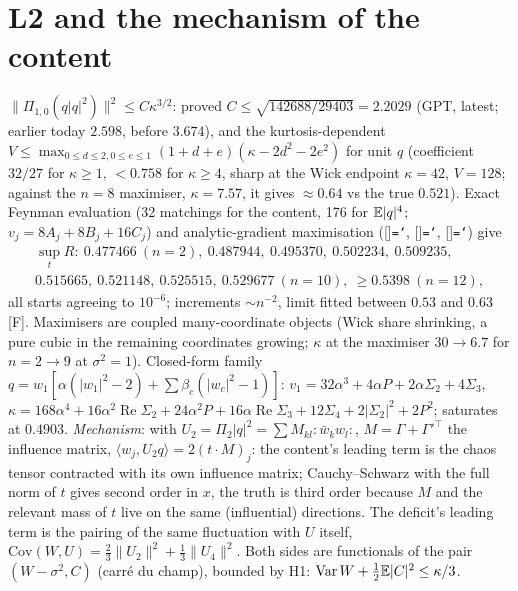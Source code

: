 \documentclass[11pt,a4paper]{article}
\renewcommand{\Re}{\operatorname{Re}}\newcommand{\Var}{\operatorname{Var}}\newcommand{\ph}{\operatorname{phase}}\newcommand{\st}[1]{\textsf{[#1]}}\newcommand{\brkus}{\textunderscore\allowbreak}\usepackage{xstring,adjustbox}\DeclareRobustCommand{\code}[1]{\begingroup\noexpandarg\StrSubstitute{#1}{/}{/\allowbreak}[\brktmp]\texttt{\let\_\brkus\hyphenchar\font=`\-\brktmp}\endgroup}\setlength{\emergencystretch}{3em}
\begin{document}
\section{L2 and the mechanism of the content}\label{sec:L2}
$\|\Pi_{1,0}(q|q|^2)\|^2\le C\kappa^{3/2}$: proved $C\le\sqrt{142688/29403}=2.2029$ (GPT, latest; earlier today $2.598$, before $3.674$), and the kurtosis-dependent $V\le\max_{0\le d\le2,0\le e\le1}(1+d+e)(\kappa-2d^2-2e^2)$ for unit $q$ (coefficient $32/27$ for $\kappa\ge1$, $<0.758$ for $\kappa\ge4$, sharp at the Wick endpoint $\kappa=42$, $V=128$; against the $n=8$ maximiser, $\kappa=7.57$, it gives $\approx0.64$ vs the true $0.521$). Exact Feynman evaluation (32 matchings for the content, 176 for $\mathbb{E}|q|^4$;
$v_j=8A_j+8B_j+16C_j$) and analytic-gradient maximisation (\code{feyn.py}, \code{feyn\_grad.py}, \code{optg.py}) give
\[\begin{gathered}
\sup_tR:\ 0.477466\ (n=2),\ 0.487944,\ 0.495370,\ 0.502234,\ 0.509235,\\
0.515665,\ 0.521148,\ 0.525515,\ 0.529677\ (n=10),\ \ge0.5398\ (n=12),\end{gathered}
\]
all starts agreeing to $10^{-6}$; increments $\sim n^{-2}$, limit fitted between $0.53$ and $0.63$ \st{F}. Maximisers are coupled many-coordinate objects (Wick share shrinking, a pure
cubic in the remaining coordinates growing; $\kappa$ at the maximiser $30\to6.7$ for $n=2\to9$ at $\sigma^2=1$). Closed-form family $q=w_1[\alpha(|w_1|^2-2)+\sum\beta_c(|w_c|^2-1)]$:
$v_1=32\alpha^3+4\alpha P+2\alpha\Sigma_2+4\Sigma_3$, $\kappa=168\alpha^4+16\alpha^2\Re\Sigma_2+24\alpha^2P+16\alpha\Re\Sigma_3+12\Sigma_4+2|\Sigma_2|^2+2P^2$; saturates at $0.4903$.
\emph{Mechanism}: with $U_2=\Pi_2|q|^2=\sum M_{kl}{:}\bar w_kw_l{:}$, $M=\Gamma+\Gamma'^{\top}$ the influence matrix, $\langle w_j,U_2q\rangle=2(t\cdot M)_j$: the content's leading term is the
chaos tensor contracted with its own influence matrix; Cauchy--Schwarz with the full norm of $t$ gives second order in $x$, the truth is third order because $M$ and the relevant
mass of $t$ live on the same (influential) directions. The deficit's leading term is the pairing of the same fluctuation with $U$ itself, $\mathrm{Cov}(W,U)=\frac23\|U_2\|^2+\frac13\|U_4\|^2$.
Both sides are functionals of the pair $(W-\sigma^2,C)$ (carré du champ), bounded by H1: $\Var W+\frac12\E|C|^2\le\kappa/3$.
\end{document}
